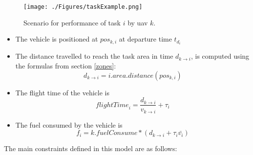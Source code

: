 	\begin{figure}[h]
		\texttt{[image: ./Figures/taskExample.png]}
		\centering
		\caption{Scenario for performance of task $i$ by \gls{uav} $k$.}
		\label{fig:assignment}
	\end{figure}

\begin{itemize}

\item The vehicle is positioned at $pos_{k,i}$ at departure time $t_{d_i}$

\item The distance travelled to reach the task area in time $d_{k \to i}$, is computed using the formulas from section \ref{zones}:
\begin{equation}
	d_{k \to i} = i.area.distance(pos_{k,i})
\end{equation}

\item The flight time of the vehicle is
\begin{equation}\label{eq:flightTime}
	{flightTime}_i= \frac{d_{k \to i}}{v_{k \to i}} + \tau_i
\end{equation}

\item The fuel consumed by the vehicle is
\begin{equation}\label{eq:fuelConsume}
	f_i=k.fuelConsume * (d_{k \to i} + \tau_i \bar{v_i})
\end{equation}

\end{itemize}

The main constraints defined in this model are as follows:

